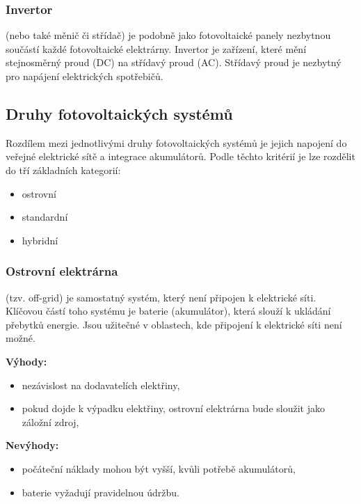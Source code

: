 \subsubsection{Invertor}

(nebo také měnič či střídač) je podobně jako fotovoltaické panely
nezbytnou součástí každé fotovoltaické elektrárny.
Invertor je zařízení, které mění stejnosměrný proud (DC) na střídavý proud (AC).
Střídavý proud je nezbytný pro napájení elektrických spotřebičů.



\subsection{Druhy fotovoltaických systémů}

Rozdílem mezi jednotlivými druhy fotovoltaických systémů je jejich napojení do veřejné elektrické sítě a integrace akumulátorů.
Podle těchto kritérií je lze rozdělit do tří základních kategorií:

\begin{itemize}
    \item ostrovní
    \item standardní
    \item hybridní
\end{itemize}

\subsubsection{Ostrovní elektrárna}

(tzv. off-grid) je samostatný systém, který není připojen k elektrické síti.
Klíčovou částí toho systému je baterie (akumulátor), která slouží k ukládání přebytků energie.
Jsou užitečné v oblastech, kde připojení k elektrické síti není možné.

\begin{multicols}{2}
    \textbf{Výhody:}
    \begin{itemize}[leftmargin=*]
        \item nezávislost na dodavatelích elektřiny,
        \item pokud dojde k výpadku elektřiny, ostrovní elektrárna bude sloužit jako záložní zdroj,
    \end{itemize}
    
    \columnbreak
    
    \textbf{Nevýhody:}
    \begin{itemize}[leftmargin=*]
        \item počáteční náklady mohou být vyšší, kvůli potřebě akumulátorů,
        \item baterie vyžadují pravidelnou údržbu.
    \end{itemize}
\end{multicols}

